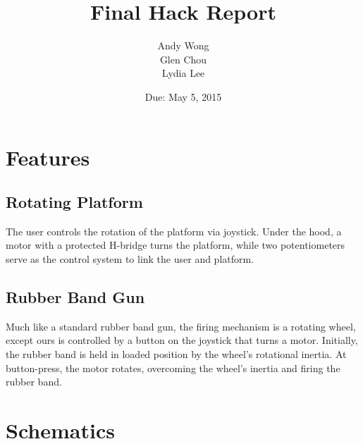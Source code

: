 \documentclass[a4paper, 11pt]{article}
\title{Final Hack Report}\author{Andy Wong\\Glen Chou\\Lydia Lee}\date{Due: May 5, 2015}
\begin{document}
\pagestyle{fancy}
\fancyhf{}
\maketitle
\tableofcontents

\newpage
\section{Features}
	\subsection{Rotating Platform}
		The user controls the rotation of the platform via joystick.  Under the hood, a motor with a protected H-bridge turns the platform, while two potentiometers serve as the control system to link the user and platform.
	\subsection{Rubber Band Gun}
		Much like a standard rubber band gun, the firing mechanism is a rotating wheel, except ours is controlled by a button on the joystick that turns a motor.  Initially, the rubber band is held in loaded position by the wheel's rotational inertia.  At button-press, the motor rotates, overcoming the wheel's inertia and firing the rubber band.
\newpage
\section{Schematics}
\end{document}
